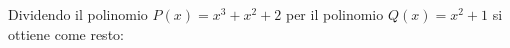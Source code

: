 Dividendo il polinomio $P(x) = x^3 + x^2 + 2$ per il polinomio 
$Q(x) = x^2 + 1$ si ottiene come resto:
